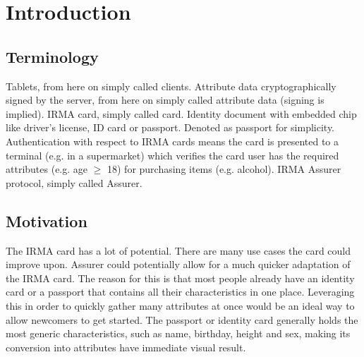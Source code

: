 \section{Introduction}

\subsection{Terminology}
Tablets, from here on simply called clients.
Attribute data cryptographically signed by the server, from here on simply called attribute data (signing is implied).
IRMA card, simply called card.
Identity document with embedded chip like driver's license, ID card or passport. Denoted as passport for simplicity.
Authentication with respect to IRMA cards means the card is presented to a terminal (e.g. in a supermarket) which verifies the card user has the required attributes (e.g. age $\geq$ 18) for purchasing items (e.g. alcohol).
IRMA Assurer protocol, simply called Assurer.

\subsection{Motivation}
The IRMA card has a lot of potential. There are many use cases the card could improve upon. Assurer could potentially allow for a much quicker adaptation of the IRMA card. The reason for this is that most people already have an identity card or a passport that contains all their characteristics in one place. Leveraging this in order to quickly gather many attributes at once would be an ideal way to allow newcomers to get started. The passport or identity card generally holds the most generic characteristics, such as name, birthday, height and sex, making its conversion into attributes have immediate visual result.